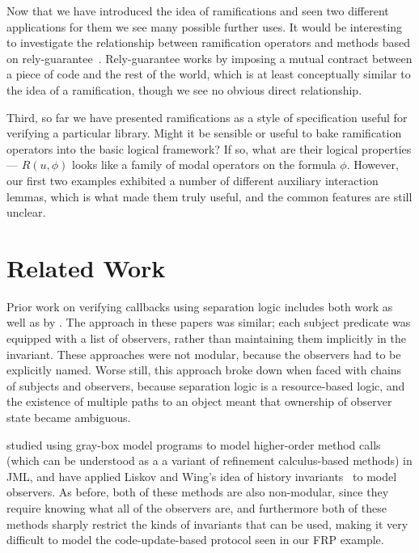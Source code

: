 Now that we have introduced the idea of ramifications and seen two
different applications for them we see many possible further uses.  It
would be interesting to investigate the relationship between
ramification operators and methods based on
rely-guarantee~\cite{rely-guarantee-jones}. Rely-guarantee works by
imposing a mutual contract between a piece of code and the rest of the
world, which is at least conceptually similar to the idea of a
ramification, though we see no obvious direct relationship.

Third, so far we have presented ramifications as a style of
specification useful for verifying a particular library.  Might it be
sensible or useful to bake ramification operators into the basic
logical framework?  If so, what are their logical properties --- $R(u,
\phi)$ looks like a family of modal operators on the formula $\phi$.
However, our first two examples exhibited a number of different
auxiliary interaction lemmas, which is what made them truly useful, 
and the common features are still unclear. 

\section{Related Work}

Prior work on verifying callbacks using separation logic includes both
\citet{tldi09,ftfjp07} work as well as by
\citet{parkinson-iwaco-07}. The approach in these papers was similar;
each subject predicate was equipped with a list of observers, rather
than maintaining them implicitly in the invariant. These approaches
were not modular, because the observers had to be explicitly
named. Worse still, this approach broke down when faced with chains of
subjects and observers, because separation logic is a resource-based
logic, and the existence of multiple paths to an object meant that
ownership of observer state became ambiguous.

\citet{shaner-leavens-naumann} studied using gray-box model programs
to model higher-order method calls (which can be understood as a a
variant of refinement calculus-based methods) in JML, and
\citet{history-invariants} have applied Liskov and Wing's idea of
history invariants~\cite{liskov-wing} to model observers. As before,
both of these methods are also non-modular, since they require knowing
what all of the observers are, and furthermore both of these methods
sharply restrict the kinds of invariants that can be used, making it
very difficult to model the code-update-based protocol seen in our FRP
example.

